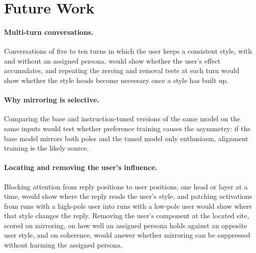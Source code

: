 \section{Future Work}
\label{sec:future}


\paragraph{Multi-turn conversations.}
Conversations of five to ten turns in which the user keeps a consistent style, with and without an assigned persona, would show whether the user's effect accumulates, and repeating the zeroing and removal tests at each turn would show whether the style heads become necessary once a style has built up.

\paragraph{Why mirroring is selective.}
Comparing the base and instruction-tuned versions of the same model on the same inputs would test whether preference training causes the asymmetry: if the base model mirrors both poles and the tuned model only enthusiasm, alignment training is the likely source.

\paragraph{Locating and removing the user's influence.}
Blocking attention from reply positions to user positions, one head or layer at a time, would show where the reply reads the user's style, and patching activations from runs with a high-pole user into runs with a low-pole user would show where that style changes the reply. Removing the user's component at the located site, scored on mirroring, on how well an assigned persona holds against an opposite user style, and on coherence, would answer whether mirroring can be suppressed without harming the assigned persona.
